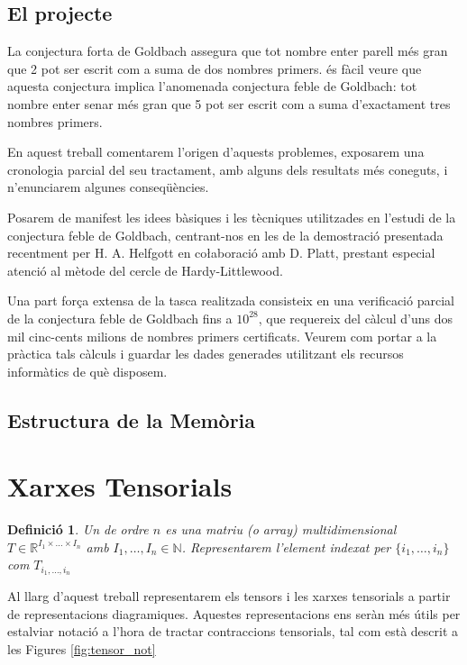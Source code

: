 \documentclass[11pt,a4paper,openright,oneside]{article}
\numberwithin{equation}{section}
\newtheorem{defi}[teo]{Definici\'o}
\theoremstyle{definition}
\begin{document}
\subsection*{El projecte}

La conjectura forta de Goldbach assegura que tot nombre enter parell m\' es gran que 2 pot ser escrit com a suma de dos nombres primers. \'es f\`acil veure que aquesta conjectura implica l'anomenada conjectura feble de Goldbach: tot nombre enter senar m\'es gran que 5 pot ser escrit com a suma d'exactament tres nombres primers.

En aquest treball comentarem l'origen d'aquests problemes, exposarem una cro\-no\-lo\-gia parcial del seu tractament, amb alguns dels resultats m\'es coneguts, i n'enunciarem algunes conseq\"u\`encies.

Posarem de manifest les idees b\`asiques i les t\`ecniques utilitzades en l'estudi de la conjectura feble de Goldbach, centrant-nos en les de la demostraci\'o presentada recentment per H. A. Helfgott en co{\l}aboraci\'o amb D. Platt, prestant especial atenci\'o al m\`etode del cercle de Hardy-Littlewood.

Una part for\c{c}a extensa de la tasca realitzada consisteix en una verificaci\'o parcial de la conjectura feble de Goldbach fins a $10^{28}$, que requereix del c\`alcul d'uns dos mil cinc-cents milions de nombres primers certificats. Veurem com portar a la pr\`actica tals c\`alculs i guardar les dades generades utilitzant els recursos inform\`atics de qu\`e disposem.


\subsection*{Estructura de la Mem\`oria}

\newpage


\section{Xarxes Tensorials}

\begin{defi}
 Un  de ordre $n$ es una matriu (o array) multidimensional $T \in \mathbb{R}^{I_1 \times \dots \times I_n}$ amb $I_1, \dots, I_n \in \mathbb{N}$.
Representarem l'element indexat per $\{i_1, \dots, i_n\}$ com $T_{i_1, \dots, i_n}$
\end{defi}

Al llarg d'aquest treball representarem els tensors i les xarxes tensorials a partir de representacions diagramiques. Aquestes
representacions ens seràn més útils per estalviar notació a l'hora de tractar contraccions tensorials, tal com està descrit
a les Figures \ref{fig:tensor_not} 
\end{document}
